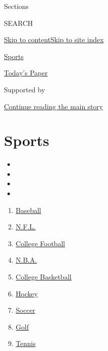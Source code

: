 Sections

SEARCH

\protect\hyperlink{site-content}{Skip to
content}\protect\hyperlink{site-index}{Skip to site index}

\href{https://www.nytimes.com/section/sports}{Sports}

\href{https://myaccount.nytimes.com/auth/login?response_type=cookie\&client_id=vi}{}

\href{https://www.nytimes.com/section/todayspaper}{Today's Paper}

Supported by

\protect\hyperlink{after-sponsor}{Continue reading the main story}

\hypertarget{sports}{%
\section{Sports}\label{sports}}

\begin{itemize}
\item
\item
\item
\item
\end{itemize}

\begin{enumerate}
\def\labelenumi{\arabic{enumi}.}
\tightlist
\item
  \href{/section/sports/baseball}{Baseball}
\item
  \href{/section/sports/football}{N.F.L.}
\item
  \href{/section/sports/ncaafootball}{College Football}
\item
  \href{/section/sports/basketball}{N.B.A.}
\item
  \href{/section/sports/ncaabasketball}{College Basketball}
\item
  \href{/section/sports/hockey}{Hockey}
\item
  \href{/section/sports/soccer}{Soccer}
\item
  \href{/section/sports/golf}{Golf}
\item
  \href{/section/sports/tennis}{Tennis}
\end{enumerate}

